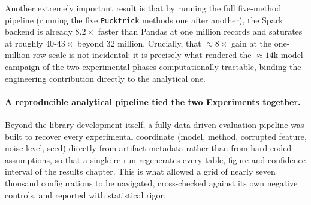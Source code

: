 \documentclass[../main.tex]{subfiles}
\begin{document}
Another extremely important result is that by running the full five-method pipeline (running the five \texttt{Pucktrick} methods one after another), the Spark backend is already $8.2\times$ faster than Pandas at one million records and saturates at roughly $40$-$43\times$ beyond $32$ million. Crucially, that $\approx 8\times$ gain at the one-million-row scale is not incidental: it is precisely what rendered the $\approx 14$k-model campaign of the two experimental phases computationally tractable, binding the engineering contribution directly to the analytical one.

\paragraph{A reproducible analytical pipeline tied the two Experiments together. \newline}
Beyond the library development itself, a fully data-driven evaluation pipeline was built to recover every experimental coordinate (model, method, corrupted feature, noise level, seed) directly from artifact metadata rather than from hard-coded assumptions, so that a single re-run regenerates every table, figure and confidence interval of the results chapter. This is what allowed a grid of nearly seven thousand configurations to be navigated, cross-checked against its own negative controls, and reported with statistical rigor.
\end{document}
